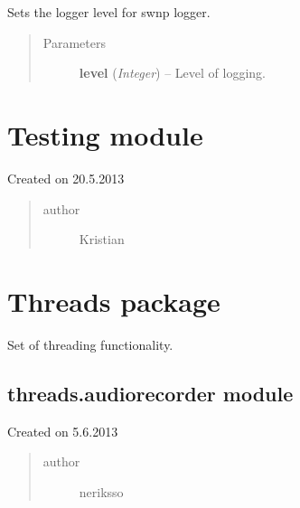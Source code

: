 \documentclass[letterpaper,10pt,english]{sphinxmanual}
\begin{document}

\begin{fulllineitems}
\label{swnp:swnp.set_logger_level}
Sets the logger level for swnp logger.
\begin{quote}\begin{description}
\item[{Parameters}] \leavevmode
\textbf{level} (\emph{Integer}) -- Level of logging.

\end{description}\end{quote}

\end{fulllineitems}



\section{Testing module}
\label{testing:module-testing}\label{testing:testing-module}\label{testing::doc}
Created on 20.5.2013
\begin{quote}\begin{description}
\item[{author}] \leavevmode
Kristian

\end{description}\end{quote}


\section{Threads package}
\label{threads:threads-package}\label{threads::doc}
Set of threading functionality.


\subsection{threads.audiorecorder module}
\label{threads:threads-audiorecorder-module}\label{threads:module-threads.audiorecorder}
Created on 5.6.2013
\begin{quote}\begin{description}
\item[{author}] \leavevmode
neriksso

\end{description}\end{quote}
\end{document}
